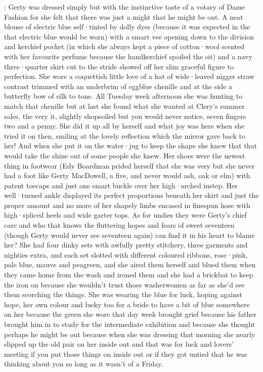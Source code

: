 :
Gerty was dressed simply
but with the instinctive taste
of a votary of Dame Fashion
for she felt
that there was just a might
that he might be out.
A neat blouse of electric blue
self·tinted by dolly dyes
(because it was expected
in the 
that electric blue would be worn)
with a smart vee
opening down to the division
and kerchief pocket
(in which
she always kept a piece of cotton·wool
scented with her favourite perfume
because the handkerchief spoiled the sit)
and a navy three·quarter skirt
cut to the stride
showed off her slim graceful figure
to perfection.
She wore a coquettish little love of a hat
of wide·leaved nigger straw
contrast trimmed
with an underbrim of eggblue chenille
and at the side
a butterfly bow of silk to tone.
All Tuesday week afternoon
she was hunting to match that chenille
but at last
she found what she wanted
at Clery's summer sales,
the very it,
slightly shopsoiled
but you would never notice,
seven fingers
two and a penny.
She did it up
all by herself
and what joy was hers
when she tried it on then,
smiling at the lovely reflection
which the mirror gave back to her!
And when she put it on the water·jug
to keep the shape
she knew that
that would take the shine
out of some people she knew.
Her shoes were the newest thing in footwear
(Edy Boardman prided herself that she was very 
but she never had a foot like Gerty MacDowell,
a five,
and never would
ash, oak or elm)
with patent toecaps
and just one smart buckle over
her high·arched instep.
Her well·turned ankle
displayed its perfect proportions
beneath her skirt
and just the proper amount and no more
of her shapely limbs
encased in finespun hose
with high·spliced heels and wide garter tops.
As for undies
they were Gerty's chief care
and who that knows
the fluttering hopes and fears
of sweet seventeen
(though Gerty would never see seventeen again)
can find it in his heart
to blame her?
She had four dinky sets
with awfully pretty stitchery,
three garments
and nighties extra,
and each set
slotted with different coloured ribbons,
rose·pink,
pale blue,
mauve
and peagreen,
and she aired them herself
and blued them
when they came home from the wash
and ironed them
and she had a brickbat to keep the iron on
because she wouldn't trust those washerwomen
as far as she'd see them
scorching the things.
She was wearing the blue for luck,
hoping against hope,
her own colour
and lucky too
for a bride to have a bit of blue somewhere on her
because the green she wore that day week
brought grief
because his father
brought him in to study
for the intermediate exhibition
and because she thought
perhaps he might be out
because when she was dressing that morning
she nearly slipped up the old pair on her inside out
and that was for luck and lovers' meeting
if you put those things on inside out
or if they got untied
that he was thinking about you
so long as it wasn't of a Friday.

